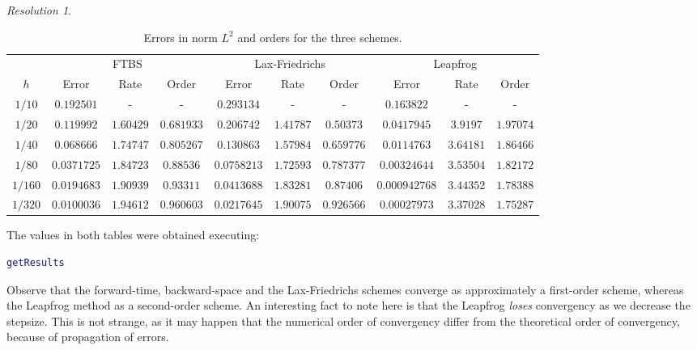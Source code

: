 \documentclass[10pt,a4paper]{article}
\theoremstyle{definition}
\theoremstyle{remark}
\newtheorem*{res}{Resolution}
\begin{document}
\begin{res}
  \begin{table}[!ht]
    \centering
    \begin{tabular}{|c||c|c|c||c|c|c||c|c|c|}
      \hline
              & \multicolumn{3}{c||}{FTBS} & \multicolumn{3}{c||}{Lax-Friedrichs} & \multicolumn{3}{c|}{Leapfrog}                                                                                \\
      \cline{2-10}
      $h$     & Error                      & Rate                                 & Order                         & Error       & Rate      & Order      & Error         & Rate      & Order     \\
      \hline\hline
      $1/10$  & $0.192501$                 & -                                    & -                             & $0.293134$  & -         & -          & $0.163822$    & -         & -         \\
      $1/20$  & $0.119992$                 & $1.60429$                            & $0.681933$                    & $0.206742$  & $1.41787$ & $0.50373$  & $0.0417945$   & $3.9197$  & $1.97074$ \\
      $1/40$  & $0.068666$                 & $1.74747$                            & $0.805267$                    & $0.130863$  & $1.57984$ & $0.659776$ & $0.0114763$   & $3.64181$ & $1.86466$ \\
      $1/80$  & $0.0371725$                & $1.84723$                            & $0.88536$                     & $0.0758213$ & $1.72593$ & $0.787377$ & $0.00324644$  & $3.53504$ & $1.82172$ \\
      $1/160$ & $0.0194683$                & $1.90939$                            & $0.93311$                     & $0.0413688$ & $1.83281$ & $0.87406$  & $0.000942768$ & $3.44352$ & $1.78388$ \\
      $1/320$ & $0.0100036$                & $1.94612$                            & $0.960603$                    & $0.0217645$ & $1.90075$ & $0.926566$ & $0.00027973$  & $3.37028$ & $1.75287$ \\
      \hline
    \end{tabular}
    \caption{Errors in norm $L^2$ and orders for the three schemes.}
  \end{table}

  The values in both tables were obtained executing:
  \begin{lstlisting}[language=Matlab]
getResults
\end{lstlisting}
  Observe that the forward-time, backward-space and the Lax-Friedrichs schemes converge as approximately a first-order scheme, whereas the Leapfrog method as a second-order scheme. An interesting fact to note here is that the Leapfrog \emph{loses} convergency as we decrease the stepsize. This is not strange, as it may happen that the numerical order of convergency differ from the theoretical order of convergency, because of propagation of errors.


\end{res}
\end{document}
